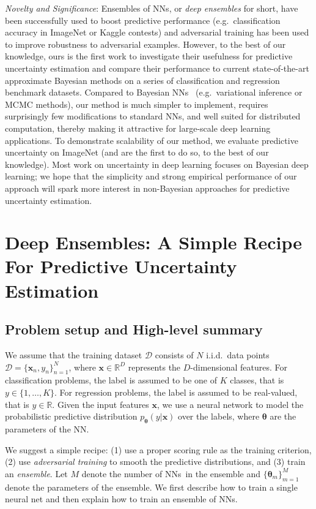 \documentclass{article}
\newcommand{\bx}{\mathbf{x}}
\newcommand{\btheta}{\mathbf{\theta}}
\newcommand{\Reals}{\mathbb{R}}
\newcommand{\D}{\mathcal{D}}
\newcommand{\nn}{NNs}
\begin{document}
\emph{Novelty and Significance}: Ensembles of NNs, or \emph{deep ensembles} for short, have been successfully used to boost predictive performance (e.g.~classification accuracy in ImageNet or Kaggle contests) and adversarial training has been used to improve robustness to adversarial examples. However, to the best of our knowledge, ours is the first work to investigate their usefulness for predictive uncertainty estimation and compare their performance to current state-of-the-art approximate Bayesian methods on a series of classification and regression benchmark datasets. %
Compared to Bayesian \nn~ (e.g.~variational inference or MCMC methods), our method is much simpler to implement, requires surprisingly few modifications to standard \nn, and well suited for distributed computation, thereby making it attractive for large-scale deep learning applications. To demonstrate scalability of our method, we evaluate predictive uncertainty on ImageNet (and are the first to do so, to the best of our knowledge). 
Most work on uncertainty in deep learning focuses on Bayesian deep learning; we hope that the simplicity and strong empirical performance of our approach will spark more interest in non-Bayesian approaches for predictive uncertainty estimation. 

\section{
Deep Ensembles: A Simple Recipe For Predictive Uncertainty Estimation
} %

\subsection{Problem setup and High-level summary}
We assume that the training dataset $\D$ consists of $N$ i.i.d.~data points $\D=\{\bx_n,y_n\}_{n=1}^N$, where $\bx\in\Reals^D$ represents the $D$-dimensional features.  For classification problems, the label is assumed to be one of $K$ classes, that is $y\in\{1,\ldots,K\}$. For regression problems, the label is assumed to be real-valued, that is $y\in\Reals$. Given the input features $\bx$, we use a  %
 neural network to model the probabilistic predictive distribution $p_\btheta(y|\bx)$ over the labels, where $\btheta$ are the parameters of the NN.

We suggest a simple recipe: (1) use a proper scoring rule as the training criterion, (2) use \emph{adversarial training} \citep{adversarial} to smooth the predictive distributions, and (3) train an \emph{ensemble}. %
Let $M$ denote the number of \nn~in the ensemble and $\{\btheta_m\}_{m=1}^M$ denote the parameters of the ensemble. 
 We first describe how to train a single neural net and then explain how to train an ensemble of \nn.
\end{document}
